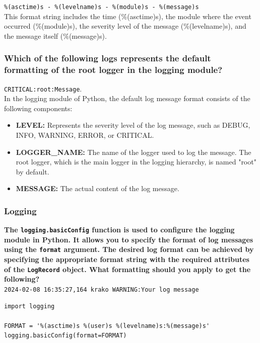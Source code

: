 \texttt{\%(asctime)s - \%(levelname)s - \%(module)s - \%(message)s}\\

This format string includes the time (\%(asctime)s), the module where the event occurred (\%(module)s), the severity level of the message (\%(levelname)s), and the message itself (\%(message)s).\\

\subsubsection{Which of the following logs represents the default formatting of the root logger in the logging module?}

\texttt{CRITICAL:root:Message}.\\
In the logging module of Python, the default log message format consists of the following components:

\begin{itemize}
    \item \textbf{LEVEL:} Represents the severity level of the log message, such as DEBUG, INFO, WARNING, ERROR, or CRITICAL.
    \item \textbf{LOGGER\_NAME:} The name of the logger used to log the message. The root logger, which is the main logger in the logging hierarchy, is named "root" by default.
    \item \textbf{MESSAGE:} The actual content of the log message.
\end{itemize}

\subsubsection{Logging}
\textbf{The \texttt{logging.basicConfig} function is used to configure the logging module in Python. It allows you to specify the format of log messages using the \texttt{format} argument. The desired log format can be achieved by specifying the appropriate format string with the required attributes of the \texttt{LogRecord} object. What formatting should you apply to get the following?}\\

\texttt{2024-02-08 16:35:27,164 krako WARNING:Your log message}

\begin{codebox}
\begin{verbatim}
import logging
 
FORMAT = '%(asctime)s %(user)s %(levelname)s:%(message)s'
logging.basicConfig(format=FORMAT)
\end{verbatim}
\end{codebox}

